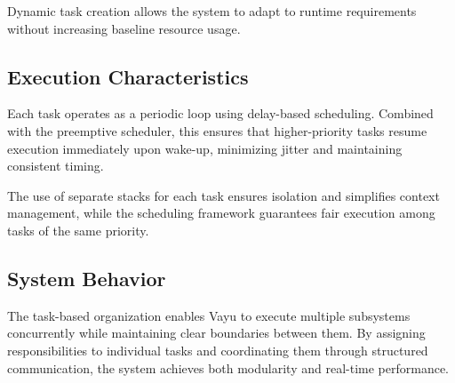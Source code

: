 Dynamic task creation allows the system to adapt to runtime requirements without increasing baseline resource usage.

\subsection{Execution Characteristics}

Each task operates as a periodic loop using delay-based scheduling. Combined with the preemptive scheduler, this ensures that higher-priority tasks resume execution immediately upon wake-up, minimizing jitter and maintaining consistent timing.

The use of separate stacks for each task ensures isolation and simplifies context management, while the scheduling framework guarantees fair execution among tasks of the same priority.

\subsection{System Behavior}

The task-based organization enables Vayu to execute multiple subsystems concurrently while maintaining clear boundaries between them. By assigning responsibilities to individual tasks and coordinating them through structured communication, the system achieves both modularity and real-time performance.

